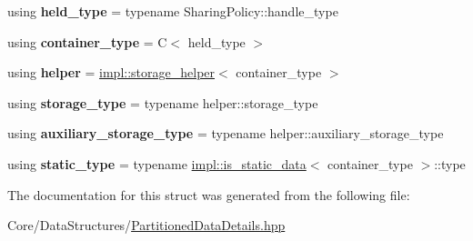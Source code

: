 \begin{DoxyCompactItemize}
\item 
\mbox{\label{structsequoia_1_1data__structures_1_1partition__impl_1_1storage__type__generator_a595376204eae6e00eae556b8ef49cdaf}} 
using {\bfseries held\+\_\+type} = typename Sharing\+Policy\+::handle\+\_\+type
\item 
\mbox{\label{structsequoia_1_1data__structures_1_1partition__impl_1_1storage__type__generator_a26a3c744ccbac8cea5b665dbe4ed9d08}} 
using {\bfseries container\+\_\+type} = C$<$ held\+\_\+type $>$
\item 
\mbox{\label{structsequoia_1_1data__structures_1_1partition__impl_1_1storage__type__generator_aa5e19162c53c2ca18f7e03a0dd0b3406}} 
using {\bfseries helper} = \mbox{\hyperlink{structsequoia_1_1data__structures_1_1impl_1_1storage__helper}{impl\+::storage\+\_\+helper}}$<$ container\+\_\+type $>$
\item 
\mbox{\label{structsequoia_1_1data__structures_1_1partition__impl_1_1storage__type__generator_a13fe4492289d47f0bfba54953db7dd05}} 
using {\bfseries storage\+\_\+type} = typename helper\+::storage\+\_\+type
\item 
\mbox{\label{structsequoia_1_1data__structures_1_1partition__impl_1_1storage__type__generator_af347fd975c05e10a6d21f390060d6021}} 
using {\bfseries auxiliary\+\_\+storage\+\_\+type} = typename helper\+::auxiliary\+\_\+storage\+\_\+type
\item 
\mbox{\label{structsequoia_1_1data__structures_1_1partition__impl_1_1storage__type__generator_a81682604ab208c2447797c86ca4a7a49}} 
using {\bfseries static\+\_\+type} = typename \mbox{\hyperlink{structsequoia_1_1data__structures_1_1impl_1_1is__static__data}{impl\+::is\+\_\+static\+\_\+data}}$<$ container\+\_\+type $>$\+::type
\end{DoxyCompactItemize}


The documentation for this struct was generated from the following file\+:\begin{DoxyCompactItemize}
\item 
Core/\+Data\+Structures/\mbox{\hyperlink{_partitioned_data_details_8hpp}{Partitioned\+Data\+Details.\+hpp}}\end{DoxyCompactItemize}
